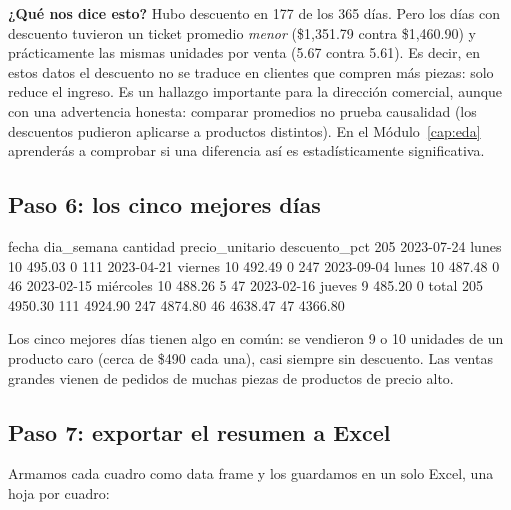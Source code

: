 \textbf{¿Qué nos dice esto?} Hubo descuento en 177 de los 365 días. Pero
los días con descuento tuvieron un ticket promedio \emph{menor} (\$1,351.79
contra \$1,460.90) y prácticamente las mismas unidades por venta (5.67
contra 5.61). Es decir, en estos datos el descuento no se traduce en
clientes que compren más piezas: solo reduce el ingreso. Es un hallazgo
importante para la dirección comercial, aunque con una advertencia
honesta: comparar promedios no prueba causalidad (los descuentos pudieron
aplicarse a productos distintos). En el Módulo~\ref{cap:eda} aprenderás
a comprobar si una diferencia así es estadísticamente significativa.

\subsection{Paso 6: los cinco mejores días}

\begin{rsalida}
         fecha dia_semana cantidad precio_unitario descuento_pct
205 2023-07-24      lunes       10          495.03             0
111 2023-04-21    viernes       10          492.49             0
247 2023-09-04      lunes       10          487.48             0
46  2023-02-15  miércoles       10          488.26             5
47  2023-02-16     jueves        9          485.20             0
      total
205 4950.30
111 4924.90
247 4874.80
46  4638.47
47  4366.80
\end{rsalida}

Los cinco mejores días tienen algo en común: se vendieron 9 o 10 unidades
de un producto caro (cerca de \$490 cada una), casi siempre sin
descuento. Las ventas grandes vienen de pedidos de muchas piezas de
productos de precio alto.

\subsection{Paso 7: exportar el resumen a Excel}

Armamos cada cuadro como data frame y los guardamos en un solo Excel, una
hoja por cuadro:

